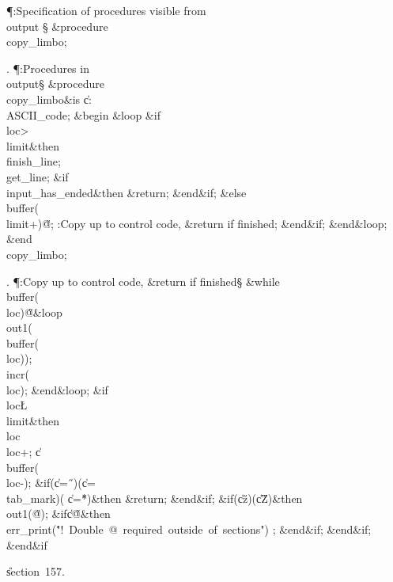 \Y\P\?\4:Specification of procedures visible from \\{output}\X\mathrel{+}%
\S\?\6
\&{procedure}\8\1\\{copy\_limbo}\2;\par
\fi

. \P\?:Procedures in \\{output}\X\mathrel{+}\S\?\6
\&{procedure}\8\1\\{copy\_limbo}\2\8\&{is}\8\1\6
\|c\?:\?\\{ASCII\_code};\6
\4\&{begin}\6
\1\&{loop}\6
\&{if}\1\1\8\\{loc}\?>\?\\{limit}\2\8\&{then}\6
\\{finish\_line};\5
\\{get\_line};\6
\&{if}\1\1\8\\{input\_has\_ended}\2\8\&{then}\6
\&{return};\2\6
\&{end}\8\2\&{if}\1;\6
\4\&{else}\6
\\{buffer}\?\1(\?\\{limit}\?+\?\2)\K\?\H{@};\6
:Copy up to control code, \&{return} if finished\X;\2\6
\&{end}\8\2\&{if}\1;\2\6
\&{end}\8\&{loop};\2\6
\&{end}\8\\{copy\_limbo};\par
\fi

. \P\?:Copy up to control code, \&{return} if finished\X\S\?\6
\1\&{while}\8\\{buffer}\?\1(\?\\{loc}\?\2)\I\?\H{@}\8\&{loop}\6
\\{out1}\?\1(\?\\{buffer}\?\1(\?\\{loc}\?\2)\2)\?;\5
\\{incr}\?\1(\?\\{loc}\?\2)\?;\2\6
\&{end}\8\&{loop};\6
\&{if}\1\1\8\\{loc}\?\L\?\\{limit}\2\8\&{then}\6
\\{loc}\?\K\?\\{loc}\?+;\5
\|c\?\K\?\\{buffer}\?\1(\?\\{loc}\?-\?\2)\?;\6
\&{if}\1\1\?\8\1(\?\|c\?=\?\H{\ }\?\2)\V\1(\?\|c\?=\?\\{tab\_mark}\?\2)\V\1(\?%
\|c\?=\?\H{*}\?\2)\?\2\8\&{then}\6
\&{return};\2\6
\&{end}\8\2\&{if}\1;\6
\&{if}\1\1\?\8\1(\?\|c\?\I\?\H{z}\?\2)\W\1(\?\|c\?\I\?\H{Z}\?\2)\?\2\8\&{then}\6
\\{out1}\?\1(\?\H{@}\?\2)\?;\6
\&{if}\1\1\8\|c\?\I\?\H{@}\2\8\&{then}\6
\\{err\_print}\?\1(\?\.{"!\ Double\ @\ required\ outside\ of\ sections"}\?\2)%
\?;\2\6
\&{end}\8\2\&{if}\1;\2\6
\&{end}\8\2\&{if}\1;\2\6
\&{end}\8\2\&{if}\1\par
\U section~157.\fi

